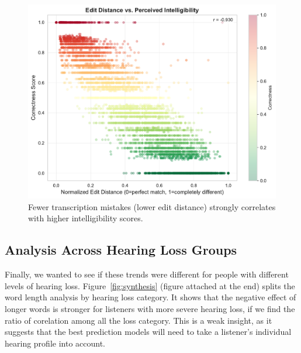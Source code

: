 \documentclass[conference]{IEEEtran}
\begin{document}
\begin{figure}[htbp]
    \centering
    \includegraphics[width=\columnwidth]{plots_assignment_1/figure_6_edit_distance.pdf}
    \caption{Fewer transcription mistakes (lower edit distance) strongly correlates with higher intelligibility scores.}
    \label{fig:edit_dist}
\end{figure}

\subsection{Analysis Across Hearing Loss Groups}
Finally, we wanted to see if these trends were different for people with different levels of hearing loss. Figure~\ref{fig:synthesis}  (figure attached at the end) splits the word length analysis by hearing loss category. It shows that the negative effect of longer words is stronger for listeners with more severe hearing loss, if we find the ratio of corelation among all the loss category. This is a weak insight, as it suggests that the best prediction models will need to take a listener's individual hearing profile into account.
\end{document}
